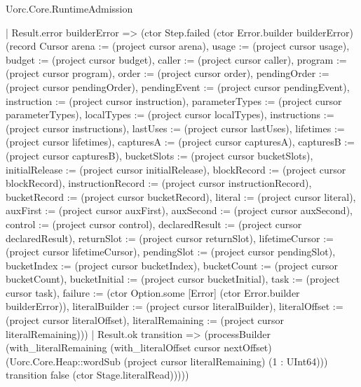 \begin{lexlean}{Uorc.Core.RuntimeAdmission}
\begin{semanticmodule}
{                | Result.error builderError => (ctor Step.failed (ctor Error.builder builderError) (record Cursor {arena := (project cursor arena), usage := (project cursor usage), budget := (project cursor budget), caller := (project cursor caller), program := (project cursor program), order := (project cursor order), pendingOrder := (project cursor pendingOrder), pendingEvent := (project cursor pendingEvent), instruction := (project cursor instruction), parameterTypes := (project cursor parameterTypes), localTypes := (project cursor localTypes), instructions := (project cursor instructions), lastUses := (project cursor lastUses), lifetimes := (project cursor lifetimes), capturesA := (project cursor capturesA), capturesB := (project cursor capturesB), bucketSlots := (project cursor bucketSlots), initialRelease := (project cursor initialRelease), blockRecord := (project cursor blockRecord), instructionRecord := (project cursor instructionRecord), bucketRecord := (project cursor bucketRecord), literal := (project cursor literal), auxFirst := (project cursor auxFirst), auxSecond := (project cursor auxSecond), control := (project cursor control), declaredResult := (project cursor declaredResult), returnSlot := (project cursor returnSlot), lifetimeCursor := (project cursor lifetimeCursor), pendingSlot := (project cursor pendingSlot), bucketIndex := (project cursor bucketIndex), bucketCount := (project cursor bucketCount), bucketInitial := (project cursor bucketInitial), task := (project cursor task), failure := (ctor Option.some [Error] (ctor Error.builder builderError)), literalBuilder := (project cursor literalBuilder), literalOffset := (project cursor literalOffset), literalRemaining := (project cursor literalRemaining)}))
                | Result.ok transition => (processBuilder (with_literalRemaining (with_literalOffset cursor nextOffset) (Uorc.Core.Heap::wordSub (project cursor literalRemaining) (1 : UInt64))) transition false (ctor Stage.literalRead)))))
}
\end{semanticmodule}
\end{lexlean}
